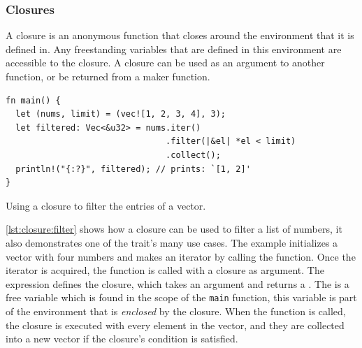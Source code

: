 
\subsubsection{Closures}
\label{sec:back:rust:closures}


A closure is an anonymous function that closes around the environment that it is defined in.
Any freestanding variables that are defined in this environment are accessible to the closure.
A closure can be used as an argument to another function, or be returned from a maker function.

\begin{listing}[H]
  \begin{verbatim}
fn main() {
  let (nums, limit) = (vec![1, 2, 3, 4], 3);
  let filtered: Vec<&u32> = nums.iter()
                                .filter(|&el| *el < limit)
                                .collect();
  println!("{:?}", filtered); // prints: `[1, 2]'
}
  \end{verbatim}
  \caption{Using a closure to filter the entries of a vector.}
  \label{lst:closure:filter}
\end{listing}

\autoref{lst:closure:filter} shows how a closure can be used to filter a list of numbers, it also demonstrates one of the  trait's many use cases.
The example initializes a vector with four numbers and makes an iterator by calling the  function.
Once the iterator is acquired, the  function is called with a closure as argument.
The expression  defines the closure, which takes an argument  and returns a .
The  is a free variable which is found in the scope of the \texttt{main} function, this variable is part of the environment that is \emph{enclosed} by the closure.
When the  function is called, the closure is executed with every element in the vector, and they are collected into a new vector if the closure's condition is satisfied.


